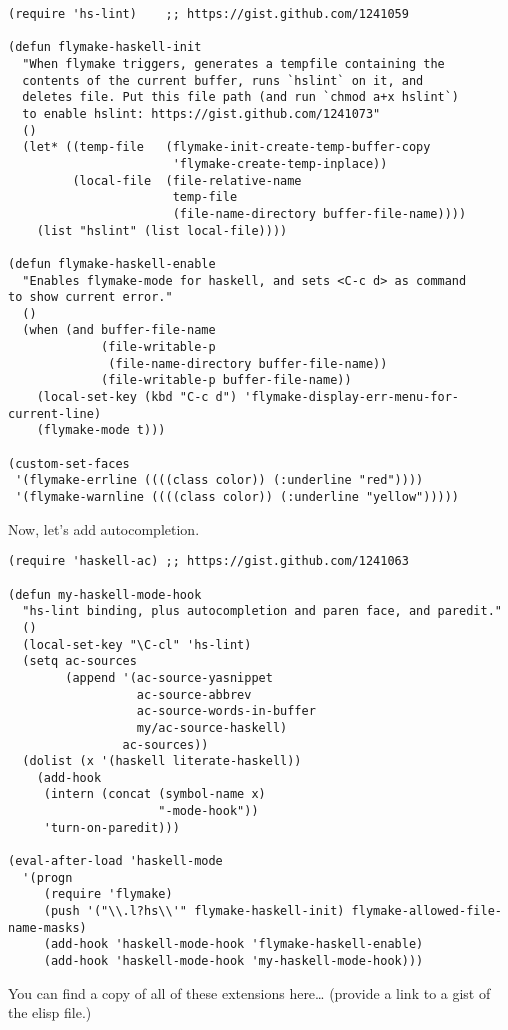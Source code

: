 \documentclass[11pt]{article}
\begin{document}
\begin{verbatim}
(require 'hs-lint)    ;; https://gist.github.com/1241059

(defun flymake-haskell-init
  "When flymake triggers, generates a tempfile containing the
  contents of the current buffer, runs `hslint` on it, and
  deletes file. Put this file path (and run `chmod a+x hslint`)
  to enable hslint: https://gist.github.com/1241073"
  ()
  (let* ((temp-file   (flymake-init-create-temp-buffer-copy
                       'flymake-create-temp-inplace))
         (local-file  (file-relative-name
                       temp-file
                       (file-name-directory buffer-file-name))))
    (list "hslint" (list local-file))))

(defun flymake-haskell-enable
  "Enables flymake-mode for haskell, and sets <C-c d> as command
to show current error."
  ()
  (when (and buffer-file-name
             (file-writable-p
              (file-name-directory buffer-file-name))
             (file-writable-p buffer-file-name))
    (local-set-key (kbd "C-c d") 'flymake-display-err-menu-for-current-line)
    (flymake-mode t)))

(custom-set-faces
 '(flymake-errline ((((class color)) (:underline "red"))))
 '(flymake-warnline ((((class color)) (:underline "yellow")))))
\end{verbatim}

Now, let's add autocompletion.


\begin{verbatim}
(require 'haskell-ac) ;; https://gist.github.com/1241063

(defun my-haskell-mode-hook
  "hs-lint binding, plus autocompletion and paren face, and paredit."
  ()
  (local-set-key "\C-cl" 'hs-lint)
  (setq ac-sources
        (append '(ac-source-yasnippet
                  ac-source-abbrev
                  ac-source-words-in-buffer
                  my/ac-source-haskell)
                ac-sources))
  (dolist (x '(haskell literate-haskell))
    (add-hook
     (intern (concat (symbol-name x)
                     "-mode-hook"))
     'turn-on-paredit)))

(eval-after-load 'haskell-mode
  '(progn
     (require 'flymake)
     (push '("\\.l?hs\\'" flymake-haskell-init) flymake-allowed-file-name-masks)
     (add-hook 'haskell-mode-hook 'flymake-haskell-enable)
     (add-hook 'haskell-mode-hook 'my-haskell-mode-hook)))
\end{verbatim}

You can find a copy of all of these extensions here\ldots{} (provide a link to a gist of the elisp file.)
\end{document}
